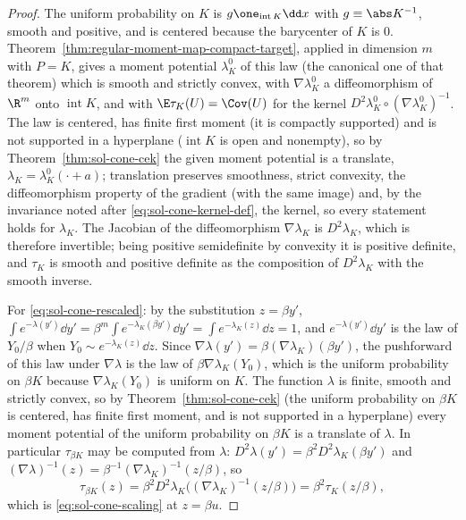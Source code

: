 \documentclass[../main.tex]{subfiles}
\begin{document}
\begin{proof}
The uniform probability on $K$ is $g\one_{\operatorname{int}K}\dd x$ with $g\equiv\abs K^{-1}$,
smooth and positive, and is centered because the barycenter of $K$ is $0$.
Theorem~\ref{thm:regular-moment-map-compact-target}, applied in dimension $m$ with $P=K$,
gives a moment potential $\lambda_K^0$ of this law (the canonical one of that theorem) which
is smooth and strictly convex, with $\nabla\lambda_K^0$ a diffeomorphism of $\R^m$ onto
$\operatorname{int}K$, and with $\E\tau_K(U)=\Cov(U)$ for the kernel
$D^2\lambda_K^0\circ(\nabla\lambda_K^0)^{-1}$.  The law is centered, has finite first moment
(it is compactly supported) and is not supported in a hyperplane
($\operatorname{int}K$ is open and nonempty), so by Theorem~\ref{thm:sol-cone-cek} the given
moment potential is a translate, $\lambda_K=\lambda_K^0(\cdot+a)$; translation preserves
smoothness, strict convexity, the diffeomorphism property of the gradient (with the same
image) and, by the invariance noted after \eqref{eq:sol-cone-kernel-def}, the kernel, so every
statement holds for $\lambda_K$.  The Jacobian of the diffeomorphism
$\nabla\lambda_K$ is $D^2\lambda_K$, which is therefore invertible; being positive
semidefinite by convexity it is positive definite, and $\tau_K$ is smooth and positive
definite as the composition of $D^2\lambda_K$ with the smooth inverse.

For \eqref{eq:sol-cone-rescaled}: by the substitution $z=\beta y'$,
$\int e^{-\lambda(y')}\dd y'=\beta^m\int e^{-\lambda_K(\beta y')}\dd y'=\int e^{-\lambda_K(z)}\dd z=1$,
and $e^{-\lambda(y')}\dd y'$ is the law of $Y_0/\beta$ when $Y_0\sim e^{-\lambda_K(z)}\dd z$.
Since $\nabla\lambda(y')=\beta(\nabla\lambda_K)(\beta y')$, the pushforward of this law under
$\nabla\lambda$ is the law of $\beta\nabla\lambda_K(Y_0)$, which is the uniform probability on
$\beta K$ because $\nabla\lambda_K(Y_0)$ is uniform on $K$.  The function $\lambda$ is finite,
smooth and strictly convex, so by Theorem~\ref{thm:sol-cone-cek} (the uniform probability on
$\beta K$ is centered, has finite first moment, and is not supported in a hyperplane) every
moment potential of the uniform probability on $\beta K$ is a translate of $\lambda$.  In
particular $\tau_{\beta K}$ may be computed from $\lambda$:
$D^2\lambda(y')=\beta^2D^2\lambda_K(\beta y')$ and
$(\nabla\lambda)^{-1}(z)=\beta^{-1}(\nabla\lambda_K)^{-1}(z/\beta)$, so
\[
  \tau_{\beta K}(z)=\beta^2D^2\lambda_K\bigl((\nabla\lambda_K)^{-1}(z/\beta)\bigr)=\beta^2\tau_K(z/\beta),
\]
which is \eqref{eq:sol-cone-scaling} at $z=\beta u$.
\end{proof}
\end{document}
